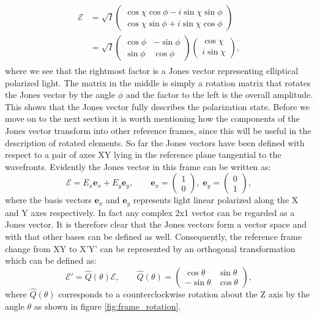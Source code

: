 \begin{align}
\begin{split}
    \bm{\mathcal{E}} &=
    \sqrt{I}
    \begin{pmatrix}
    \cos \chi \cos \phi - i\sin \chi \sin \phi \\
    \cos \chi \sin \phi + i\sin \chi \cos \phi
    \end{pmatrix}
    \\
    &=
    \sqrt{I}
    \begin{pmatrix}
    \cos \phi & -\sin \phi \\
    \sin \phi & \cos \phi
    \end{pmatrix}
    \begin{pmatrix}
    \cos \chi \\
    i\sin \chi
    \end{pmatrix},
\end{split}
\end{align}
where we see that the rightmost factor is a Jones vector representing elliptical polarized light. The matrix in the middle is simply a rotation matrix that rotates the Jones vector by the angle $\phi$ and the factor to the left is the overall amplitude. This shows that the Jones vector fully describes the polarization state. Before we move on to the next section it is worth mentioning how the components of the Jones vector transform into other reference frames, since this will be useful in the description of rotated elements. So far the Jones vectors have been defined with respect to a pair of axes XY lying in the reference plane tangential to the wavefronts. Evidently the Jones vector in this frame can be written as:
\begin{equation}
    \bm{\mathcal{E}} = E_x \bm{e}_x + E_y \bm{e}_y, \qquad 
    \bm{e}_x = 
    \begin{pmatrix}
    1 \\
    0
    \end{pmatrix},
    \;
    \bm{e}_y = 
    \begin{pmatrix}
    0 \\
    1
    \end{pmatrix},
\end{equation}
where the basis vectors $\bm{e}_x$ and $\bm{e}_y$ represents light linear polarized along the X and Y axes respectively. In fact any complex 2x1 vector can be regarded as a Jones vector. It is therefore clear that the Jones vectors form a vector space and with that other bases can be defined as well. Consequently, the reference frame change from XY to X'Y' can be represented by an orthogonal transformation which can be defined as:
\begin{equation}
    \label{eq:jones_vector_transformation}
    \bm{\mathcal{E}}' = \hat{Q}(\theta) \bm{\mathcal{E}}, \qquad
    \hat{Q}(\theta) =
    \begin{pmatrix}
    \cos \theta & \sin \theta \\
    -\sin \theta & \cos \theta
    \end{pmatrix},
\end{equation}
where $\hat{Q}(\theta)$ corresponds to a counterclockwise rotation about the Z axis by the angle $\theta$ as shown in figure \ref{fig:frame_rotation}. 

